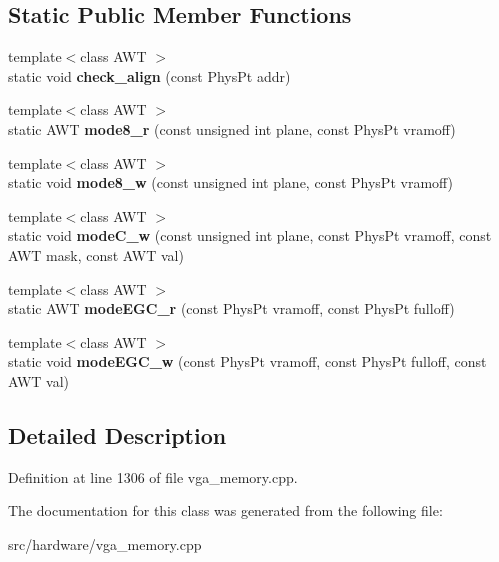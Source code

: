 \subsection*{Static Public Member Functions}
\begin{DoxyCompactItemize}
\item 
\hypertarget{classVGA__PC98__PageHandler_ad0cab17b7f08ec55aea9fa00c6154ef5}{{\footnotesize template$<$class A\-W\-T $>$ }\\static void {\bfseries check\-\_\-align} (const Phys\-Pt addr)}\label{classVGA__PC98__PageHandler_ad0cab17b7f08ec55aea9fa00c6154ef5}

\item 
\hypertarget{classVGA__PC98__PageHandler_a258b7ab8e0bf52a16e15c16ab0811670}{{\footnotesize template$<$class A\-W\-T $>$ }\\static A\-W\-T {\bfseries mode8\-\_\-r} (const unsigned int plane, const Phys\-Pt vramoff)}\label{classVGA__PC98__PageHandler_a258b7ab8e0bf52a16e15c16ab0811670}

\item 
\hypertarget{classVGA__PC98__PageHandler_a64b218e643644a33e0c298622dbe72b9}{{\footnotesize template$<$class A\-W\-T $>$ }\\static void {\bfseries mode8\-\_\-w} (const unsigned int plane, const Phys\-Pt vramoff)}\label{classVGA__PC98__PageHandler_a64b218e643644a33e0c298622dbe72b9}

\item 
\hypertarget{classVGA__PC98__PageHandler_ad50a2f65155811c9398c8c17ccf65fb1}{{\footnotesize template$<$class A\-W\-T $>$ }\\static void {\bfseries mode\-C\-\_\-w} (const unsigned int plane, const Phys\-Pt vramoff, const A\-W\-T mask, const A\-W\-T val)}\label{classVGA__PC98__PageHandler_ad50a2f65155811c9398c8c17ccf65fb1}

\item 
\hypertarget{classVGA__PC98__PageHandler_a12e4eba4a8b70a108fa7623c3333043e}{{\footnotesize template$<$class A\-W\-T $>$ }\\static A\-W\-T {\bfseries mode\-E\-G\-C\-\_\-r} (const Phys\-Pt vramoff, const Phys\-Pt fulloff)}\label{classVGA__PC98__PageHandler_a12e4eba4a8b70a108fa7623c3333043e}

\item 
\hypertarget{classVGA__PC98__PageHandler_aea2664bee908ecf657cb3d114303d867}{{\footnotesize template$<$class A\-W\-T $>$ }\\static void {\bfseries mode\-E\-G\-C\-\_\-w} (const Phys\-Pt vramoff, const Phys\-Pt fulloff, const A\-W\-T val)}\label{classVGA__PC98__PageHandler_aea2664bee908ecf657cb3d114303d867}

\end{DoxyCompactItemize}


\subsection{Detailed Description}


Definition at line 1306 of file vga\-\_\-memory.\-cpp.



The documentation for this class was generated from the following file\-:\begin{DoxyCompactItemize}
\item 
src/hardware/vga\-\_\-memory.\-cpp\end{DoxyCompactItemize}
